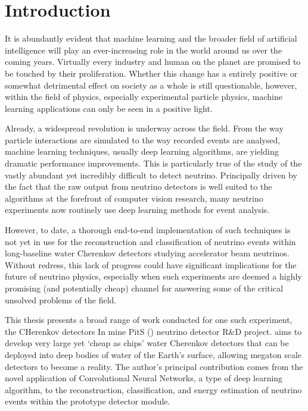 \chapter{Introduction} %
\label{chap:introduction} %
\setcounter{page}{15}  %

It is abundantly evident that machine learning and the broader field of artificial intelligence
will play an ever-increasing role in the world around us over the coming years. Virtually every
industry and human on the planet are promised to be touched by their proliferation. Whether this
change has a entirely positive or somewhat detrimental effect on society as a whole is still
questionable, however, within the field of physics, especially experimental particle physics,
machine learning applications can only be seen in a positive light.

Already, a widespread revolution is underway across the field. From the way particle interactions
are simulated to the way recorded events are analysed, machine learning techniques, usually deep
learning algorithms, are yielding dramatic performance improvements. This is particularly true of
the study of the vastly abundant yet incredibly difficult to detect neutrino. Principally driven
by the fact that the raw output from neutrino detectors is well suited to the algorithms at the
forefront of computer vision research, many neutrino experiments now routinely use deep learning
methods for event analysis.

However, to date, a thorough end-to-end implementation of such techniques is not yet in use for
the reconstruction and classification of neutrino events within long-baseline water Cherenkov
detectors studying accelerator beam neutrinos. Without redress, this lack of progress could have
significant implications for the future of neutrino physics, especially when such experiments are
deemed a highly promising (and potentially cheap) channel for answering some of the critical
unsolved problems of the field.

This thesis presents a broad range of work conducted for one such experiment, the CHerenkov
detectors In mine PitS (\chips) neutrino detector R\&D project. \chips aims to develop very large
yet `cheap as chips' water Cherenkov detectors that can be deployed into deep bodies of water of
the Earth's surface, allowing megaton scale detectors to become a reality. The author's principal
contribution comes from the novel application of Convolutional Neural Networks, a type of deep
learning algorithm, to the reconstruction, classification, and energy estimation of neutrino
events within the \chipsfive prototype detector module.

